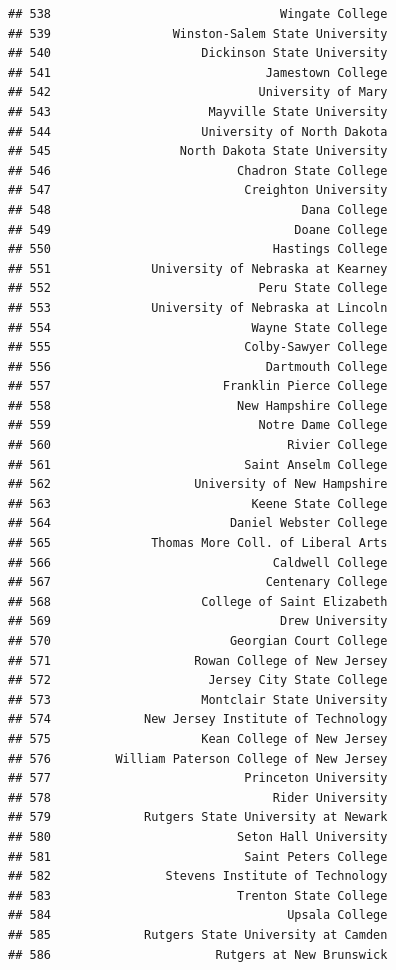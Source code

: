 \documentclass[]{article}
\begin{document}
\begin{verbatim}
## 538                                Wingate College
## 539                 Winston-Salem State University
## 540                     Dickinson State University
## 541                              Jamestown College
## 542                             University of Mary
## 543                      Mayville State University
## 544                     University of North Dakota
## 545                  North Dakota State University
## 546                          Chadron State College
## 547                           Creighton University
## 548                                   Dana College
## 549                                  Doane College
## 550                               Hastings College
## 551              University of Nebraska at Kearney
## 552                             Peru State College
## 553              University of Nebraska at Lincoln
## 554                            Wayne State College
## 555                           Colby-Sawyer College
## 556                              Dartmouth College
## 557                        Franklin Pierce College
## 558                          New Hampshire College
## 559                             Notre Dame College
## 560                                 Rivier College
## 561                           Saint Anselm College
## 562                    University of New Hampshire
## 563                            Keene State College
## 564                         Daniel Webster College
## 565              Thomas More Coll. of Liberal Arts
## 566                               Caldwell College
## 567                              Centenary College
## 568                     College of Saint Elizabeth
## 569                                Drew University
## 570                         Georgian Court College
## 571                    Rowan College of New Jersey
## 572                      Jersey City State College
## 573                     Montclair State University
## 574             New Jersey Institute of Technology
## 575                     Kean College of New Jersey
## 576         William Paterson College of New Jersey
## 577                           Princeton University
## 578                               Rider University
## 579             Rutgers State University at Newark
## 580                          Seton Hall University
## 581                           Saint Peters College
## 582                Stevens Institute of Technology
## 583                          Trenton State College
## 584                                 Upsala College
## 585             Rutgers State University at Camden
## 586                       Rutgers at New Brunswick

\end{verbatim}
\end{document}
